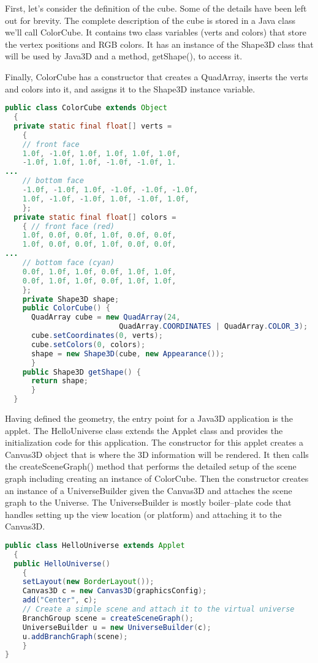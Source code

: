 First, let's consider the definition of the cube. Some of the details have been left out for brevity. The complete description of the cube is stored in a Java class we’ll call ColorCube. It contains two class variables (verts and colors) that store the vertex positions and RGB colors. It has an instance of the Shape3D class that will be used by Java3D and a method, getShape(), to access it.

Finally, ColorCube has a constructor that creates a QuadArray, inserts the verts and colors into it, and assigns it to the Shape3D instance variable.

\begin{lstlisting}[language=Java, caption={}, numbers=none, frame=none]
public class ColorCube extends Object
  {
  private static final float[] verts =
    {
    // front face
    1.0f, -1.0f, 1.0f, 1.0f, 1.0f, 1.0f,
    -1.0f, 1.0f, 1.0f, -1.0f, -1.0f, 1.
...
    // bottom face
    -1.0f, -1.0f, 1.0f, -1.0f, -1.0f, -1.0f,
    1.0f, -1.0f, -1.0f, 1.0f, -1.0f, 1.0f,
    };
  private static final float[] colors =
    { // front face (red)
    1.0f, 0.0f, 0.0f, 1.0f, 0.0f, 0.0f,
    1.0f, 0.0f, 0.0f, 1.0f, 0.0f, 0.0f,
...
    // bottom face (cyan)
    0.0f, 1.0f, 1.0f, 0.0f, 1.0f, 1.0f,
    0.0f, 1.0f, 1.0f, 0.0f, 1.0f, 1.0f,
    };
    private Shape3D shape;
    public ColorCube() {
      QuadArray cube = new QuadArray(24,
                          QuadArray.COORDINATES | QuadArray.COLOR_3);
      cube.setCoordinates(0, verts);
      cube.setColors(0, colors);
      shape = new Shape3D(cube, new Appearance());
      }
    public Shape3D getShape() {
      return shape;
      }
  }
\end{lstlisting}

Having defined the geometry, the entry point for a Java3D application is the applet. The HelloUniverse class extends the Applet class and provides the initialization code for this application. The constructor for this applet creates a Canvas3D object that is where the 3D information will be rendered. It then calls the createSceneGraph() method that performs the detailed setup of the scene graph including creating an instance of ColorCube. Then the constructor creates an instance of a UniverseBuilder given the Canvas3D and attaches the scene graph to the Universe. The UniverseBuilder is mostly boiler--plate code that handles setting up the view location (or platform) and attaching it to the Canvas3D.

\begin{lstlisting}[language=Java, caption={}, numbers=none, frame=none]
public class HelloUniverse extends Applet
  {
  public HelloUniverse()
    {
    setLayout(new BorderLayout());
    Canvas3D c = new Canvas3D(graphicsConfig);
    add("Center", c);
    // Create a simple scene and attach it to the virtual universe
    BranchGroup scene = createSceneGraph();
    UniverseBuilder u = new UniverseBuilder(c);
    u.addBranchGraph(scene);
    }
}
\end{lstlisting}

